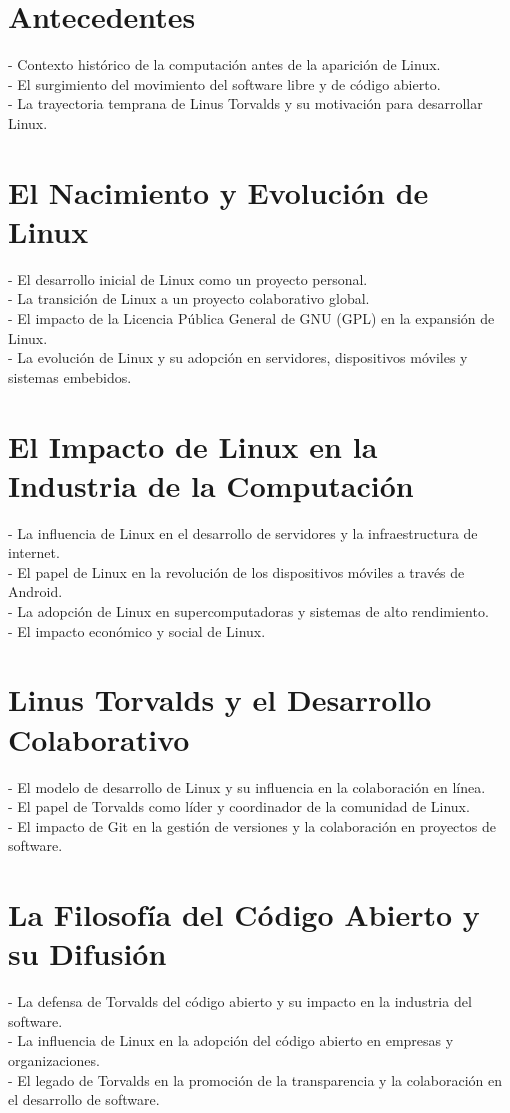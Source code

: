 \documentclass[a4paper,12pt]{article}
\begin{document}
\section{Antecedentes} - Contexto histórico de la computación antes de la
aparición de Linux.\\ - El surgimiento del movimiento del software libre y de
código abierto.\\ - La trayectoria temprana de Linus Torvalds y su motivación
para desarrollar Linux.

\section{El Nacimiento y Evolución de Linux} - El desarrollo inicial de Linux
como un proyecto personal.\\ - La transición de Linux a un proyecto colaborativo
global.\\ - El impacto de la Licencia Pública General de GNU (GPL) en la
expansión de Linux.\\ - La evolución de Linux y su adopción en servidores,
dispositivos móviles y sistemas embebidos.

\section{El Impacto de Linux en la Industria de la Computación} - La influencia
de Linux en el desarrollo de servidores y la infraestructura de internet.\\ - El
papel de Linux en la revolución de los dispositivos móviles a través de
Android.\\ - La adopción de Linux en supercomputadoras y sistemas de alto
rendimiento.\\ - El impacto económico y social de Linux.

\section{Linus Torvalds y el Desarrollo Colaborativo} - El modelo de desarrollo
de Linux y su influencia en la colaboración en línea.\\ - El papel de Torvalds
como líder y coordinador de la comunidad de Linux.\\ - El impacto de Git en la
gestión de versiones y la colaboración en proyectos de software.

\section{La Filosofía del Código Abierto y su Difusión} - La defensa de Torvalds
del código abierto y su impacto en la industria del software.\\ - La influencia
de Linux en la adopción del código abierto en empresas y organizaciones.\\ - El
legado de Torvalds en la promoción de la transparencia y la colaboración en el
desarrollo de software.
\end{document}
